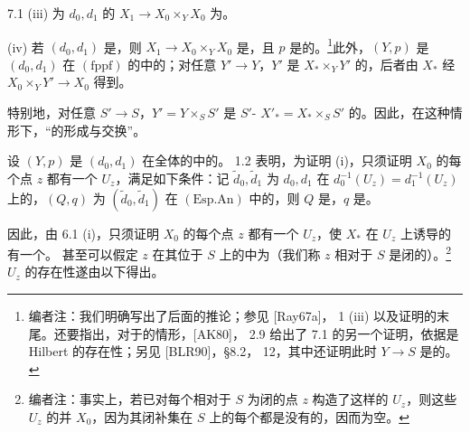 \begin{SGAresult}{}{7.1}
(iii) 为 $d_0,d_1$ 的 $X_1\to X_0\times_YX_0$ 为。

(iv) 若 $(d_0,d_1)$ 是，则 $X_1\to X_0\times_YX_0$ 是，且 $p$ 是的。\footnote{编者注：我们明确写出了后面的推论；参见 [Ray67a]， 1 (iii) 以及证明的末尾。还要指出，对于的情形，[AK80]， 2.9 给出了 7.1 的另一个证明，依据是 Hilbert 的存在性；另见 [BLR90]，\S 8.2， 12，其中还证明此时 $Y\to S$ 是的。}此外，$(Y,p)$ 是 $(d_0,d_1)$ 在 $(\mathrm{fppf})$ 的中的；对任意 $Y'\to Y$，$Y'$ 是 $X_*\times_YY'$ 的，后者由 $X_*$ 经 $X_0\times_YY'\to X_0$ 得到。

特别地，对任意 $S'\to S$，$Y'=Y\times_SS'$ 是 $S'$- $X'_*=X_*\times_SS'$ 的。因此，在这种情形下，“的形成与交换”。
\end{SGAresult}
设 $(Y,p)$ 是 $(d_0,d_1)$ 在全体的中的。 1.2 表明，为证明 (i)，只须证明 $X_0$ 的每个点 $z$ 都有一个 $U_z$，满足如下条件：记 $\widetilde d_0,\widetilde d_1$ 为 $d_0,d_1$ 在 $d_0^{-1}(U_z)=d_1^{-1}(U_z)$ 上的，$(Q,q)$ 为 $(\widetilde d_0,\widetilde d_1)$ 在 $(\mathrm{Esp.An})$ 中的，则 $Q$ 是，$q$ 是。

因此，由 6.1 (i)，只须证明 $X_0$ 的每个点 $z$ 都有一个 $U_z$，使 $X_*$ 在 $U_z$ 上诱导的有一个。
甚至可以假定 $z$ 在其位于 $S$ 上的中为（我们称 $z$ 相对于 $S$ 是闭的）。\footnote{编者注：事实上，若已对每个相对于 $S$ 为闭的点 $z$ 构造了这样的 $U_z$，则这些 $U_z$ 的并 $X_0$，因为其闭补集在 $S$ 上的每个都是没有的，因而为空。}$U_z$ 的存在性遂由以下得出。

